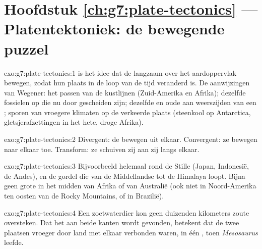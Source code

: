 \section*{Hoofdstuk \ref{ch:g7:plate-tectonics} --- Platentektoniek: de bewegende puzzel}

\begin{solution}{exo:g7:plate-tectonics:1}
 is het idee dat de  langzaam over het
aardoppervlak bewegen, zodat hun plaats in de loop van de tijd veranderd
is. De aanwijzingen van Wegener: het passen van de kustlijnen
(Zuid-Amerika en Afrika); dezelfde fossielen op  die nu door
 gescheiden zijn; dezelfde  en oude  aan
weerszijden van een ; sporen van vroegere klimaten op de verkeerde
plaats (steenkool op Antarctica, gletsjerafzettingen in het hete, droge
Afrika).
\end{solution}

\begin{solution}{exo:g7:plate-tectonics:2}
Divergent: de  bewegen uit elkaar. Convergent: ze bewegen naar elkaar
toe. Transform: ze schuiven zij aan zij langs elkaar.
\end{solution}

\begin{solution}{exo:g7:plate-tectonics:3}
Bijvoorbeeld helemaal rond de Stille  (Japan, Indonesië, de Andes),
en de gordel die van de Middellandse  tot de Himalaya loopt. Bijna geen
grote  in het midden van Afrika of van Australië (ook niet in
Noord-Amerika ten oosten van de Rocky Mountains, of in Brazilië).
\end{solution}

\begin{solution}{exo:g7:plate-tectonics:4}
Een zoetwaterdier kon geen duizenden kilometers zoute  oversteken.
Dat het aan beide kanten wordt gevonden, betekent dat de twee plaatsen
vroeger door land met elkaar verbonden waren, in één , toen
\emph{Mesosaurus} leefde.
\end{solution}


